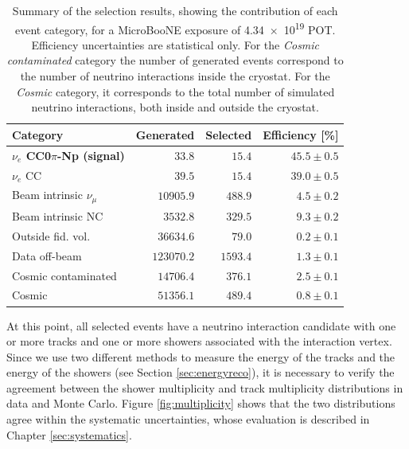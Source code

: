 \begin{table}[htbp]
   \centering
      \caption{Summary of the selection results, showing the contribution of each event category, for a MicroBooNE exposure of \num{4.34e19} POT. Efficiency uncertainties are statistical only. {For the \emph{Cosmic contaminated} category the number of generated events correspond to the number of neutrino interactions inside the cryostat. For the \emph{Cosmic} category, it corresponds to the total number of simulated neutrino interactions, both inside and outside the cryostat.}}\label{tab:result}
   \begin{tabular}{lrrr}
     \toprule
     Category & Generated & Selected & Efficiency [\%]\\
     \midrule

     \textbf{$\nu_{e}$ CC0$\pi$-Np (signal)}  & $33.8$    & $15.4$  & $45.5\pm0.5$\\
     $\nu_{e}$ CC                             & $39.5$    & $15.4$  & $39.0\pm0.5$\\
     Beam intrinsic $\nu_{\mu}$               & $10905.9$ & $488.9$ & $4.5\pm0.2$\\
     Beam intrinsic NC                        & $3532.8$  & $329.5$ & $9.3\pm0.2$\\
     Outside fid. vol.                        & $36634.6$ & $79.0$  & $0.2\pm0.1$\\
     Data off-beam                            & $123070.2$ & $1593.4$ & $1.3\pm0.1$\\
     Cosmic contaminated                      & $14706.4$  & $376.1$  & $2.5\pm0.1$\\ 
     Cosmic                                   & $51356.1$  & $489.4$  & $0.8\pm0.1$\\

     \bottomrule
   \end{tabular}

\end{table}

At this point, all selected events have a neutrino interaction candidate with one or more tracks and one or more showers associated with the interaction vertex. Since we use two different methods to measure the energy of the tracks and the energy of the showers (see Section \ref{sec:energyreco}), it is necessary to verify the agreement between the shower multiplicity and track multiplicity distributions in data and Monte Carlo. Figure \ref{fig:multiplicity} shows that the two distributions agree within the systematic uncertainties, whose evaluation is described in Chapter \ref{sec:systematics}.

